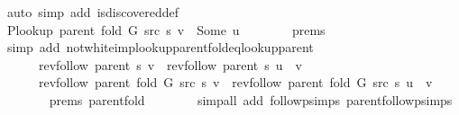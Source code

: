 \begin{isabellebody}
\ {\isacharparenleft}{\kern0pt}auto\ simp\ add{\isacharcolon}{\kern0pt}\ is{\isacharunderscore}{\kern0pt}discovered{\isacharunderscore}{\kern0pt}def{\isacharparenright}{\kern0pt}\isanewline
\ \ \ \ \isamarkupfalse%
\ \isamarkupfalse%
\ {\isachardoublequoteopen}P{\isacharunderscore}{\kern0pt}lookup\ {\isacharparenleft}{\kern0pt}parent\ {\isacharparenleft}{\kern0pt}fold\ G\ src\ s{\isacharparenright}{\kern0pt}{\isacharparenright}{\kern0pt}\ v\ {\isacharequal}{\kern0pt}\ Some\ u{\isachardoublequoteclose}\isanewline
\ \ \ \ \ \ \isamarkupfalse%
\ {\isachardoublequoteopen}{}{\isachardot}{\kern0pt}prems{\isachardoublequoteclose}\isanewline
\ \ \ \ \ \ \isamarkupfalse%
\ {\isacharparenleft}{\kern0pt}simp\ add{\isacharcolon}{\kern0pt}\ not{\isacharunderscore}{\kern0pt}white{\isacharunderscore}{\kern0pt}imp{\isacharunderscore}{\kern0pt}lookup{\isacharunderscore}{\kern0pt}parent{\isacharunderscore}{\kern0pt}fold{\isacharunderscore}{\kern0pt}eq{\isacharunderscore}{\kern0pt}lookup{\isacharunderscore}{\kern0pt}parent{\isacharparenright}{\kern0pt}\isanewline
\ \ \ \ \isamarkupfalse%
\ \isamarkupfalse%
\isanewline
\ \ \ \ \ \ {\isachardoublequoteopen}rev{\isacharunderscore}{\kern0pt}follow\ {\isacharparenleft}{\kern0pt}parent\ s{\isacharparenright}{\kern0pt}\ v\ {\isacharequal}{\kern0pt}\ rev{\isacharunderscore}{\kern0pt}follow\ {\isacharparenleft}{\kern0pt}parent\ s{\isacharparenright}{\kern0pt}\ u\ {\isacharat}{\kern0pt}\ {\isacharbrackleft}{\kern0pt}v{\isacharbrackright}{\kern0pt}{\isachardoublequoteclose}\isanewline
\ \ \ \ \ \ {\isachardoublequoteopen}rev{\isacharunderscore}{\kern0pt}follow\ {\isacharparenleft}{\kern0pt}parent\ {\isacharparenleft}{\kern0pt}fold\ G\ src\ s{\isacharparenright}{\kern0pt}{\isacharparenright}{\kern0pt}\ v\ {\isacharequal}{\kern0pt}\ rev{\isacharunderscore}{\kern0pt}follow\ {\isacharparenleft}{\kern0pt}parent\ {\isacharparenleft}{\kern0pt}fold\ G\ src\ s{\isacharparenright}{\kern0pt}{\isacharparenright}{\kern0pt}\ u\ {\isacharat}{\kern0pt}\ {\isacharbrackleft}{\kern0pt}v{\isacharbrackright}{\kern0pt}{\isachardoublequoteclose}\isanewline
\ \ \ \ \ \ \isamarkupfalse%
\ {\isachardoublequoteopen}{}{\isachardot}{\kern0pt}prems{\isachardoublequoteclose}{\isacharparenleft}{\kern0pt}{}{\isacharparenright}{\kern0pt}\ parent{\isacharunderscore}{\kern0pt}fold\isanewline
\ \ \ \ \ \ \isamarkupfalse%
\ {\isacharparenleft}{\kern0pt}simp{\isacharunderscore}{\kern0pt}all\ add{\isacharcolon}{\kern0pt}\ follow{\isacharunderscore}{\kern0pt}psimps\ parent{\isachardot}{\kern0pt}follow{\isacharunderscore}{\kern0pt}psimps{\isacharparenright}{\kern0pt}\isanewline

\end{isabellebody}
